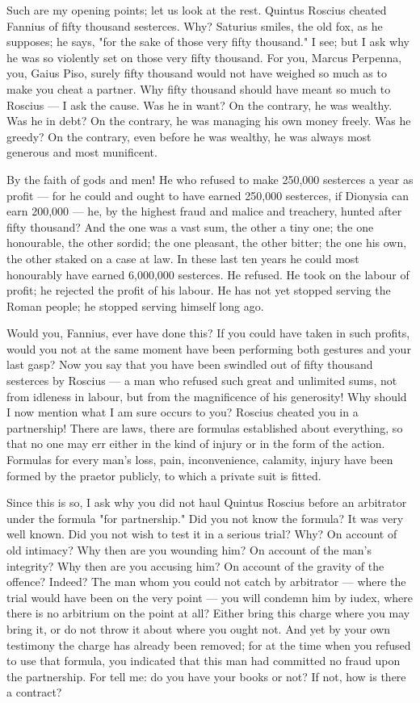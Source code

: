  Such are my opening points; let us look at the rest. Quintus Roscius cheated Fannius of fifty thousand sesterces. Why? Saturius smiles, the old fox, as he supposes; he says, "for the sake of those very fifty thousand." I see; but I ask why he was so violently set on those very fifty thousand. For you, Marcus Perpenna, you, Gaius Piso, surely fifty thousand would not have weighed so much as to make you cheat a partner. Why fifty thousand should have meant so much to Roscius --- I ask the cause. Was he in want? On the contrary, he was wealthy. Was he in debt? On the contrary, he was managing his own money freely. Was he greedy? On the contrary, even before he was wealthy, he was always most generous and most munificent.

 By the faith of gods and men! He who refused to make 250,000 sesterces a year as profit --- for he could and ought to have earned 250,000 sesterces, if Dionysia can earn 200,000 --- he, by the highest fraud and malice and treachery, hunted after fifty thousand? And the one was a vast sum, the other a tiny one; the one honourable, the other sordid; the one pleasant, the other bitter; the one his own, the other staked on a case at law. In these last ten years he could most honourably have earned 6,000,000 sesterces. He refused. He took on the labour of profit; he rejected the profit of his labour. He has not yet stopped serving the Roman people; he stopped serving himself long ago.

 Would you, Fannius, ever have done this? If you could have taken in such profits, would you not at the same moment have been performing both gestures and your last gasp? Now you say that you have been swindled out of fifty thousand sesterces by Roscius --- a man who refused such great and unlimited sums, not from idleness in labour, but from the magnificence of his generosity! Why should I now mention what I am sure occurs to you? Roscius cheated you in a partnership! There are laws, there are formulas established about everything, so that no one may err either in the kind of injury or in the form of the action. Formulas for every man's loss, pain, inconvenience, calamity, injury have been formed by the praetor publicly, to which a private suit is fitted.

 Since this is so, I ask why you did not haul Quintus Roscius before an arbitrator under the formula "for partnership." Did you not know the formula? It was very well known. Did you not wish to test it in a serious trial? Why? On account of old intimacy? Why then are you wounding him? On account of the man's integrity? Why then are you accusing him? On account of the gravity of the offence? Indeed? The man whom you could not catch by arbitrator --- where the trial would have been on the very point --- you will condemn him by iudex, where there is no arbitrium on the point at all? Either bring this charge where you may bring it, or do not throw it about where you ought not. And yet by your own testimony the charge has already been removed; for at the time when you refused to use that formula, you indicated that this man had committed no fraud upon the partnership. For tell me: do you have your books or not? If not, how is there a contract?

